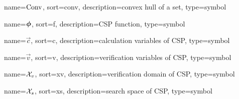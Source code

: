 	{%
		name=\ensuremath{\func{Conv}},
		sort=conv,
		description=convex hull of a set,
		type=symbol
	}
	\newcommand{\convexhull}{\gls{sym:convexhull}}


	{%
		name=\ensuremath{\vecfunc{\phi}},
		sort=f,
		description=CSP function,
		type=symbol
	}
	\newcommand{\cspfunc}{\gls{sym:cspfunc}}

	{%
		name=\ensuremath{\vec{c}},
		sort=c,
		description=calculation variables of CSP,
		type=symbol
	}
	\newcommand{\calcvars}{\gls{sym:calcvars}}

	{%
		name=\ensuremath{\vec{v}},
		sort=v,
		description=verification variables of CSP,
		type=symbol
	}
	\newcommand{\vervars}{\gls{sym:vervars}}

	{%
		name=\ensuremath{\set{X}_{v}},
		sort=xv,
		description=verification domain of CSP,
		type=symbol
	}
	\newcommand{\verdomain}{\gls{sym:verdomain}}

	{%
		name=\ensuremath{\set{X}_{s}},
		sort=xs,
		description=search space of CSP,
		type=symbol
	}
	\newcommand{\cspsearchspace}{\gls{sym:cspsearchspace}}

